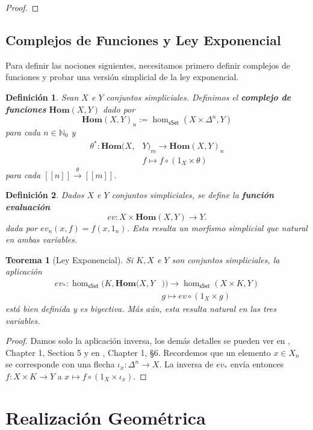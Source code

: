 \documentclass[11pt]{report}
\theoremstyle{colored}
\newtheorem{definition}{Definición}[section]
\newtheorem{theorem}{Teorema}[section]
\newcommand{\N}{\mathbb{N}}
\newcommand{\nat}[1]{[\![#1]\!]}
\newcommand{\ord}[1]{\nat{#1}}
\newcommand{\cat}[1]{\mathsf{#1}}
\renewcommand{\ss}[1]{\Delta^{#1}}
\newcommand{\homcomplex}{\mathbf{Hom}}
\begin{document}
\begin{proof}
\end{proof}

\subsection{Complejos de Funciones y Ley Exponencial}

Para definir las nociones siguientes, necesitamos primero definir complejos de funciones y probar una versión simplicial de la ley exponencial.

\begin{definition} Sean $X$ e $Y$ conjuntos simpliciales. Definimos el \textbf{complejo de funciones} $\homcomplex(X,Y)$ dado por
\[
\homcomplex(X,Y)_n := \hom_{\cat{sSet}}(X \times \ss{n},Y)
\]
para cada $n \in \N_0$ y 
\begin{align*}
\theta^* : \homcomplex(X,&Y)_m \to \homcomplex(X,Y)_n \\
&f \longmapsto f \circ (1_X \times \theta)
\end{align*}
para cada $\ord{n} \xrightarrow{\theta} \ord{m}$.
\end{definition}

\begin{definition} Dados $X$ e $Y$ conjuntos simpliciales, se define la \textbf{función evaluación}
\[
ev : X \times \homcomplex(X,Y) \to Y.
\]
dada por $ev_n(x,f) = f(x,1_n)$. Esta resulta un morfismo simplicial que natural en ambas variables.
\end{definition}

\begin{theorem}[Ley Exponencial] Si $K,X$ e $Y$ son conjuntos simpliciales, la aplicación
\begin{align*}
ev_* : \hom_{\cat{sSet}}(K,\homcomplex(X,Y&)) \to \hom_{\cat{sSet}}(X \times K,Y)\\
&g \longmapsto ev \circ (1_X \times g)
\end{align*}
está bien definida y es biyectiva. Más aún, esta resulta natural en las tres variables.
\end{theorem}
\begin{proof} Damos solo la aplicación inversa, los demás detalles se pueden ver en \cite{GJ}, Chapter 1, Section 5 y en \cite{M}, Chapter 1, \S 6. Recordemos que un elemento $x \in X_n$ se corresponde con una flecha $\iota_x : \ss{n} \to X$. La inversa de $ev_*$ envía entonces $f : X \times K \to Y$ a $x \mapsto f \circ (1_X \times \iota_x)$.
\end{proof}

\section{Realización Geométrica}
\end{document}

